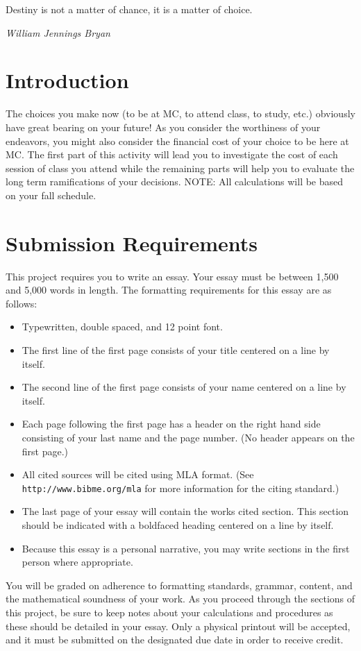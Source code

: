 \documentclass{article}
\begin{document}
    \epigraph{Destiny is not a matter of chance, it is a matter of choice.}{\textit{William Jennings Bryan}}

\section*{Introduction}
The choices you make now (to be at MC, to attend class, to study, etc.) obviously have great bearing 
on your future! As you consider the worthiness of your endeavors, you might also consider the 
financial cost of your choice to be here at MC. The first part of this activity will lead you to investigate 
the cost of each session of class you attend while the remaining parts will help you to evaluate the 
long term ramifications of your decisions. NOTE: 
All calculations will be based on your fall schedule.

\section*{Submission Requirements}
This project requires you to write an essay.  Your essay must be between 1,500 and 5,000 words in length.  The formatting requirements for this essay are as follows:
\begin{itemize}
    \item Typewritten, double spaced, and 12 point font.
    \item The first line of the first page consists of your title centered on a line by itself.
    \item The second line of the first page consists of your name centered on a line by itself.
    \item Each page following the first page has a header on the right hand side consisting of your last name and the page number.  (No header appears on the first page.)
    \item All cited sources will be cited using MLA format.\newline
    (See {\tt http://www.bibme.org/mla} for more information for the citing standard.)
    \item The last page of your essay will contain the
    works cited section.  This section should be indicated with a boldfaced heading centered on a line by itself.
    \item Because this essay is a personal narrative, you may write sections in the first person where appropriate.
\end{itemize}

You will be graded on adherence to formatting standards, grammar, content, and the mathematical soundness of your work.  As you proceed through the sections of this project, be sure to keep notes about your calculations and procedures as these should be detailed in your essay.  Only a physical printout will be accepted, and it must be submitted on the designated due date in order to receive credit.
\end{document}
